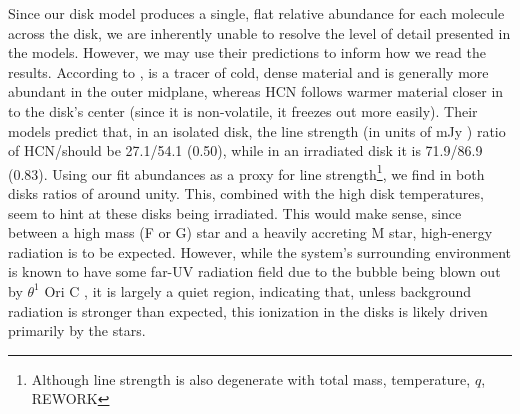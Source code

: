Since our disk model produces a single, flat relative abundance for each molecule across the disk, we are inherently unable to resolve the level of detail presented in the models. However, we may use their predictions to inform how we read the results. According to \citet{Walsh2013}, \hco is a tracer of cold, dense material and is generally more abundant in the outer midplane, whereas HCN follows warmer material closer in to the disk's center (since it is non-volatile, it freezes out more easily). Their models predict that, in an isolated disk, the line strength (in units of mJy \kms) ratio of HCN/\hco should be 27.1/54.1 (0.50), while in an irradiated disk it is 71.9/86.9 (0.83). Using our fit abundances as a proxy for line strength\footnote{Although line strength is also degenerate with total mass, temperature, $q$, REWORK}, we find in both disks ratios of around unity. This, combined with the high disk temperatures, seem to hint at these disks being irradiated. This would make sense, since between a high mass (F or G) star and a heavily accreting M star, high-energy radiation is to be expected. However, while the system's surrounding environment is known to have some far-UV radiation field due to the bubble being blown out by $\theta^1$ Ori C \citep{Pabst2019}, it is largely a quiet region, indicating that, unless background radiation is stronger than expected, this ionization in the disks is likely driven primarily by the stars.






